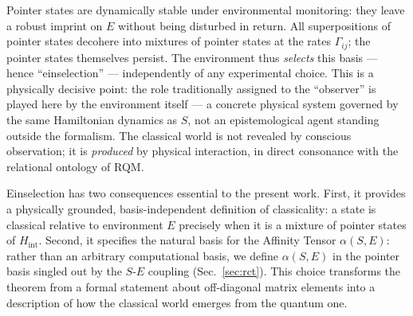 Pointer states are dynamically stable under environmental
monitoring: they leave a robust imprint on $E$ without being
disturbed in return.
All superpositions of pointer states decohere into mixtures of pointer
states at the rates $\Gamma_{ij}$; the pointer states themselves
persist.
The environment thus \emph{selects} this basis --- hence
``einselection'' --- independently of any experimental choice.
This is a physically decisive point: the role traditionally assigned
to the ``observer'' is played here by the environment itself --- a
concrete physical system governed by the same Hamiltonian dynamics as
$S$, not an epistemological agent standing outside the formalism.
The classical world is not revealed by conscious observation; it is
\emph{produced} by physical interaction, in direct consonance with the
relational ontology of RQM.

Einselection has two consequences essential to the present work.
First, it provides a physically grounded, basis-independent definition
of classicality: a state is classical relative to environment $E$
precisely when it is a mixture of pointer states of $H_{\mathrm{int}}$.
Second, it specifies the natural basis for the Affinity Tensor
$\alpha(S, E)$: rather than an arbitrary computational basis,
we define $\alpha(S, E)$ in the pointer basis singled out by the
$S$-$E$ coupling (Sec.~\ref{sec:rct}).
This choice transforms the theorem from a formal statement about
off-diagonal matrix elements into a description of how the classical
world emerges from the quantum one.

